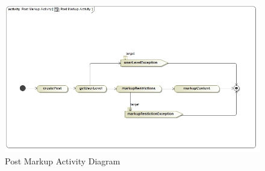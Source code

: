 \documentclass[11pt]{article}
\begin{document}
\begin{enumerate}
\graphicspath{ {../Diagrams/Matt/Activity/} }
	  \begin{figure}[H]	
    	\includegraphics[scale=0.5]{PostMarkupActivity.jpg}
    	\caption{Post Markup Activity Diagram}
	\end{figure}
	

\end{enumerate}
\end{document}
